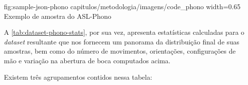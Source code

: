 \figura
{fig:sample-json-phono} %
{capitulos/metodologia/imagens/code_phono} %
{width=0.65\linewidth} %
{Exemplo de amostra do ASL-Phono} %
{} %


A \autoref{tab:dataset-phono-stats}, por sua vez, apresenta estatísticas calculadas para o \textit{dataset} resultante que nos fornecem um panorama da distribuição final de suas amostras, bem como do número de movimentos, orientações, configurações de mão e variação na abertura de boca computados acima.




Existem três agrupamentos contidos nessa tabela:

